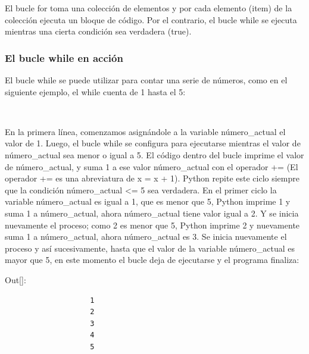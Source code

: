 {		El bucle {\ttfamily for} toma una colección de elementos y  por cada elemento (item) de la colección ejecuta un bloque de código. Por el contrario, el bucle  {\ttfamily while} se ejecuta mientras una  cierta condición sea verdadera (true). 
		
		\subsubsection{El bucle while en acción}
		
		El bucle {\ttfamily while} se puede utilizar para contar una serie de números, 
		como en el siguiente ejemplo, el  {\ttfamily while} cuenta de 1 hasta el 5:
		
		\hspace{-2.5cm}{\ttfamily \scriptsize contando.py}\vspace{-0.55cm}
		\begin{lstlisting}		
			
		\end{lstlisting}	
		
		En la primera línea, comenzamos asignándole a la variable  {\ttfamily número\_actual} el valor de 1. Luego, el bucle {\ttfamily while} se configura para ejecutarse mientras el valor de {\ttfamily número\_actual}  sea menor o igual a 5. El código dentro del bucle imprime el valor de {\ttfamily número\_actual}, y suma 1 a ese valor {\ttfamily número\_actual} con el operador {\ttfamily +=} (El operador {\ttfamily +=} es una abreviatura de {\ttfamily x = x + 1}). Python repite este ciclo siempre que la condición {\ttfamily número\_actual <= 5} sea verdadera. En el primer ciclo la variable  {\ttfamily número\_actual} es igual a  1, que es menor que 5, Python imprime 1 y  suma 1 a {\ttfamily número\_actual}, ahora {\ttfamily número\_actual} tiene valor igual a 2. Y se inicia nuevamente el proceso;  como 2 es menor que 5, Python imprime 2 y nuevamente  suma 1  a {\ttfamily número\_actual},  ahora {\ttfamily número\_actual}  es 3. Se inicia nuevamente el proceso y así sucesivamente, hasta  que el valor de la variable {\ttfamily número\_actual} es mayor que 5, en este momento el bucle deja de ejecutarse y el programa finaliza:
		
		{\ttfamily\scriptsize\scriptsize \noindent Out[]:\vspace{-0.3cm}	
			{\color{blue} 	
				\begin{verbatim}	
					1
					2
					3
					4
					5	
				\end{verbatim}
		}} 
		
}
